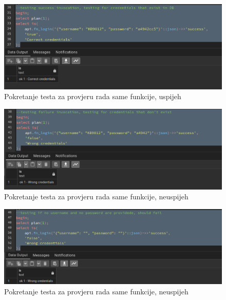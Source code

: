 				\begin{figure}[H]
					\centering
					\includegraphics[width=\textwidth]{slike/unit_tests/ut_1/success_login.png}
					\caption{Pokretanje testa za provjeru rada same funkcije, uspijeh}
					\label{fig: IS1-uspješni login}
				\end{figure}
				\begin{figure}[H]
					\centering
					\includegraphics[width=\textwidth]{slike/unit_tests/ut_1/failure_login.png}
					\caption{Pokretanje testa za provjeru rada same funkcije, neuspijeh}
					\label{fig: IS1-neuspješni login}
				\end{figure}
				\begin{figure}[H]
					\centering
					\includegraphics[width=\textwidth]{slike/unit_tests/ut_1/no_creds.png}
					\caption{Pokretanje testa za provjeru rada same funkcije, neuspijeh}
					\label{fig: IS1-login bez vjerodajnica}
				\end{figure}

